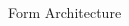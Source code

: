 \documentclass[11pt]{beamer}
\begin{document}
\begin{frame}
\begin{columns}[onlytextwidth]
\begin{column}{0.4\textwidth}
\begin{figure}[hbtp]
				\caption{Form Architecture}
			\end{figure}
			
		\end{column}
	\end{columns}
	
\end{frame}
\end{document}
